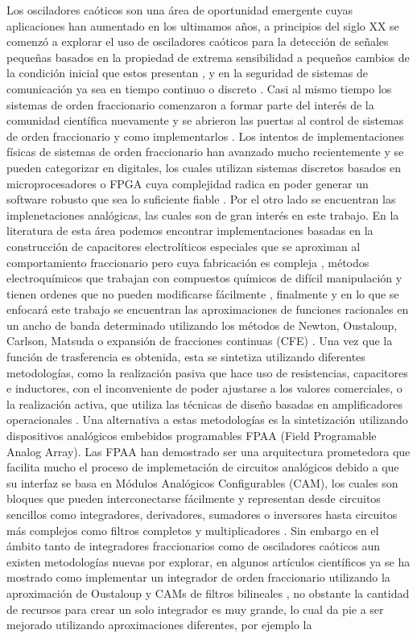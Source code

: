 	Los osciladores caóticos son una área de oportunidad emergente cuyas aplicaciones han aumentado en los ultimamos años, a principios del siglo XX se comenzó a explorar el uso de osciladores caóticos para la detección de señales pequeñas basados en la propiedad  de extrema sensibilidad a pequeños cambios de la condición inicial que estos presentan \cite{Wang1999}, y en la seguridad de sistemas de comunicación ya sea en tiempo continuo o discreto \cite{Tepina2002}.  Casi al mismo tiempo los sistemas de orden fraccionario comenzaron a formar parte del interés de la comunidad científica nuevamente y se abrieron las puertas al control de sistemas de orden fraccionario y como implementarlos \cite{Chen2009,Das2007}. Los intentos de implementaciones físicas de sistemas de orden fraccionario han avanzado mucho recientemente y se pueden categorizar en digitales, los cuales utilizan sistemas discretos basados en microprocesadores o FPGA cuya complejidad radica en poder generar un software robusto que sea lo suficiente fiable \cite{Gunay2017}. Por el otro lado se encuentran las implenetaciones analógicas, las cuales son de gran interés en este trabajo. En la literatura de esta área podemos encontrar implementaciones basadas en la construcción de capacitores electrolíticos especiales que se aproximan al comportamiento fraccionario pero cuya fabricación es compleja \cite{Jesus2008}, métodos electroquímicos que trabajan con compuestos químicos de difícil manipulación y tienen ordenes que no pueden modificarse fácilmente \cite{Biswas2006}, finalmente y en lo que se enfocará este trabajo se encuentran las aproximaciones de funciones racionales en un ancho de banda determinado utilizando los métodos de Newton, Oustaloup, Carlson, Matsuda o expansión de fracciones continuas (CFE) \cite{Charef2006,Krishna2011,Krishna2008}. Una vez que la función de trasferencia es obtenida, esta se sintetiza utilizando diferentes metodologías, como la realización pasiva que hace uso de resistencias, capacitores e inductores, con el inconveniente de poder ajustarse a los valores comerciales, o la realización activa, que utiliza las técnicas de diseño basadas en amplificadores operacionales \cite{Tepljakov2013, Dorcak2012}. Una alternativa a estas metodologías es la sintetización utilizando dispositivos analógicos embebidos programables FPAA (Field Programable Analog Array). Las FPAA han demostrado ser una arquitectura prometedora que facilita mucho el proceso de implemetación de circuitos analógicos debido a que su interfaz se basa en Módulos Analógicos Configurables (CAM), los cuales son bloques que pueden interconectarse fácilmente y representan desde circuitos sencillos como integradores, derivadores, sumadores o inversores hasta circuitos más complejos como filtros completos y multiplicadores \cite{Fragoulis2009}. Sin embargo en el ámbito tanto de integradores fraccionarios como de osciladores caóticos aun existen metodologías nuevas por explorar, en algunos artículos científicos ya se ha mostrado como implementar un integrador de orden fraccionario utilizando la aproximación de Oustaloup y CAMs de filtros bilineales \cite{Caponetto2006}, no obstante la cantidad de recursos para crear un solo integrador es muy grande, lo cual da pie a ser mejorado utilizando aproximaciones diferentes, por ejemplo la 